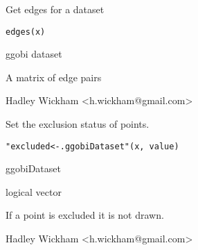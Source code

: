 \documentclass{article}
\begin{document}
\begin{Description}\relax
Get edges for a dataset
\end{Description}
\begin{Usage}
\begin{verbatim}edges(x)\end{verbatim}
\end{Usage}
\begin{Arguments}
\begin{ldescription}
\item[\code{x}] ggobi dataset
\end{ldescription}
\end{Arguments}
\begin{Details}\relax
\end{Details}
\begin{Value}
A matrix of edge pairs
\end{Value}
\begin{Author}\relax
Hadley Wickham <h.wickham@gmail.com>
\end{Author}
\begin{Examples}
\begin{ExampleCode}\end{ExampleCode}
\end{Examples}

\begin{Description}\relax
Set the exclusion status of points.
\end{Description}
\begin{Usage}
\begin{verbatim}"excluded<-.ggobiDataset"(x, value)\end{verbatim}
\end{Usage}
\begin{Arguments}
\begin{ldescription}
\item[\code{x}] ggobiDataset
\item[\code{value}] logical vector
\end{ldescription}
\end{Arguments}
\begin{Details}\relax
If a point is excluded it is not drawn.
\end{Details}
\begin{Author}\relax
Hadley Wickham <h.wickham@gmail.com>
\end{Author}
\begin{SeeAlso}\relax
{}
\end{SeeAlso}
\begin{Examples}
\begin{ExampleCode}\end{ExampleCode}
\end{Examples}
\end{document}
